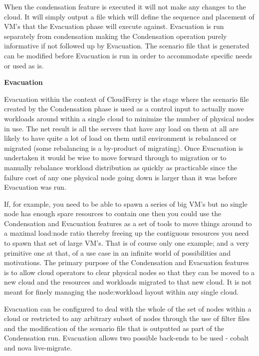\documentclass{article}
\begin{document}
{\color{color03} When the condensation feature is executed it will not make any 
changes to the cloud. It will simply output a file which will define the sequence 
and placement of VM's that the Evacuation phase will execute against. Evacuation 
is run separately from condensation making the Condensation operation purely informative 
if not followed up by Evacuation. The scenario file that is generated can be modified 
before Evacuation is run in order to accommodate specific needs or used as is.}

\vspace{30pt}
{\large{}{\color{color03} \textbf{Evacuation}}}

\vspace{2pt}
{\color{color03} Evacuation within the context of CloudFerry is the stage where 
the scenario file created by the Condensation phase is used as a control input 
to actually move workloads around within a single cloud to minimize the number 
of physical nodes in use. The net result is all the servers that have any load 
on them at all are likely to have quite a lot of load on them until environment 
is rebalanced or migrated (some rebalancing is a by-product of migrating). Once 
Evacuation is undertaken it would be wise to move forward through to migration 
or to manually rebalance workload distribution as quickly as practicable since 
the failure cost of any one physical node going down is larger than it was before 
Evacuation was run.}

\vspace{2pt}
{\color{color03} If, for example, you need to be able to spawn a series of big 
VM's but no single node has enough spare resources to contain one then you could 
use the Condensation and Evacuation features as a set of tools to move things around 
to a maximal load:node ratio thereby freeing up the contiguous resources you need 
to spawn that set of large VM's. That is of course only one example; and a very 
primitive one at that, of a use case in an infinite world of possibilities and 
motivations. The primary purpose of the Condensation and Evacuation features is 
to allow cloud operators to clear physical nodes so that they can be moved to a 
new cloud and the resources and workloads migrated to that new cloud. It is not 
meant for finely managing the node:workload layout within any single cloud. }

\vspace{2pt}
{\color{color03} Evacuation can be configured to deal with the whole of the set 
of nodes within a cloud or restricted to any arbitrary subset of nodes through 
the use of filter files and the modification of the scenario file that is outputted 
as part of the Condensation run. Evacuation allows two possible back-ends to be 
used - cobalt and nova live-migrate. }
\end{document}
